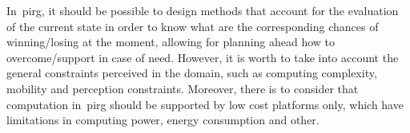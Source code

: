 In~\gls{pirg}, it should be possible to design methods that account for the evaluation of the current state in order to know what are the corresponding chances of winning/losing at the moment, allowing for planning ahead how to overcome/support in case of need. However, it is worth to take into account the general constraints perceived in the domain, such as computing complexity, mobility and perception constraints. %
Moreover, there is to consider that computation in~\gls{pirg} should be supported by low cost platforms only, which have limitations in computing power, energy consumption and other. 